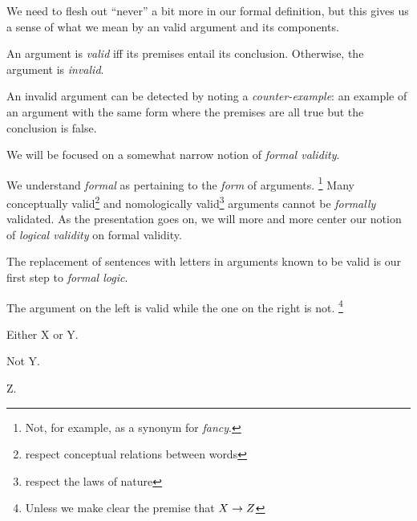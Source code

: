 We need to flesh out ``never'' a bit more in our formal definition, but this
gives us a sense of what we mean by an valid argument and its components.

\begin{definition}
  \label{def:informal-validity}
  An argument is \emph{valid} iff its premises entail its conclusion. Otherwise,
  the argument is \emph{invalid}.
\end{definition}

An invalid argument can be detected by noting a \emph{counter-example}: an
example of an argument with the same form where the premises are all true but
the conclusion is false.


%


We will be focused on a somewhat narrow notion of \emph{formal validity}.

We understand \emph{formal} as pertaining to the \emph{form} of arguments.
\footnote{Not, for example, as a synonym for \emph{fancy}.} Many conceptually
valid\footnote{respect conceptual relations between words} and nomologically
valid\footnote{respect the laws of nature} arguments cannot be \emph{formally}
validated. As the presentation goes on, we will more and more center our notion
of \emph{logical validity} on formal validity. 

The replacement of sentences with letters in arguments known to be valid is
our first step to \emph{formal logic}.

The argument on the left is valid while the one on the right is not.
\footnote{Unless we make clear the premise that $X\rightarrow Z$}

 {
  \begin{argument}
  \item[] Either X or Y.
  \item[] Not Y.
  \item[\therefore] Z.
  \end{argument}
}

